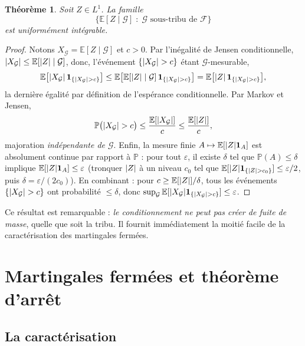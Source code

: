 \documentclass[11pt,a4paper]{article}
\theoremstyle{plain}
\newtheorem{theorem}{Théorème}[section]
\theoremstyle{definition}
\theoremstyle{remark}
\newcommand{\E}{\mathbb{E}}
\newcommand{\Prob}{\mathbb{P}}
\newcommand{\F}{\mathcal{F}}
\newcommand{\G}{\mathcal{G}}
\newcommand{\ind}{\mathbf{1}}
\DeclarePairedDelimiter{\abs}{\lvert}{\rvert}
\begin{document}
\begin{theorem}\label{thm:cond-UI}
Soit $Z \in L^1$. La famille
\[
\bigl\{\E[Z \mid \G] \;:\; \G \text{ sous-tribu de } \F\bigr\}
\]
est uniformément intégrable.
\end{theorem}

\begin{proof}
Notons $X_\G = \E[Z \mid \G]$ et $c > 0$. Par l'inégalité de Jensen
conditionnelle, $\abs{X_\G} \le \E[\abs{Z} \mid \G]$, donc, l'événement
$\{\abs{X_\G} > c\}$ étant $\G$-mesurable,
\[
\E\bigl[\abs{X_\G}\,\ind_{\{\abs{X_\G}>c\}}\bigr]
\le \E\bigl[\E[\abs{Z}\mid\G]\,\ind_{\{\abs{X_\G}>c\}}\bigr]
= \E\bigl[\abs{Z}\,\ind_{\{\abs{X_\G}>c\}}\bigr],
\]
la dernière égalité par définition de l'espérance conditionnelle. Par Markov et
Jensen,
\[
\Prob\bigl(\abs{X_\G} > c\bigr) \le \frac{\E[\abs{X_\G}]}{c}
\le \frac{\E[\abs{Z}]}{c},
\]
majoration \emph{indépendante de $\G$}. Enfin, la mesure finie
$A \mapsto \E[\abs{Z}\ind_A]$ est absolument continue par rapport à $\Prob$ :
pour tout $\varepsilon$, il existe $\delta$ tel que $\Prob(A) \le \delta$
implique $\E[\abs{Z}\ind_A] \le \varepsilon$ (tronquer $\abs{Z}$ à un niveau
$c_0$ tel que $\E[\abs{Z}\ind_{\{\abs{Z}>c_0\}}] \le \varepsilon/2$, puis
$\delta = \varepsilon/(2c_0)$). En combinant : pour $c \ge \E[\abs{Z}]/\delta$,
tous les événements $\{\abs{X_\G}>c\}$ ont probabilité $\le \delta$, donc
$\sup_\G \E[\abs{X_\G}\ind_{\{\abs{X_\G}>c\}}] \le \varepsilon$.
\end{proof}

Ce résultat est remarquable : \emph{le conditionnement ne peut pas créer de
fuite de masse}, quelle que soit la tribu. Il fournit immédiatement la moitié
facile de la caractérisation des martingales fermées.

\section{Martingales fermées et théorème d'arrêt}

\subsection{La caractérisation}
\end{document}
